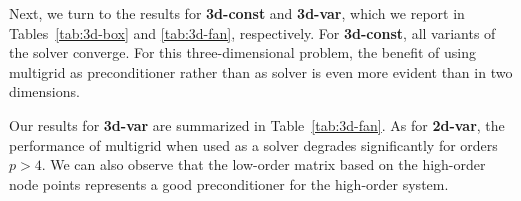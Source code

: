 \documentclass[times]{nlaauth}
\begin{document}

Next, we turn to the results for {\bf 3d-const} and {\bf 3d-var},
which we report in Tables~\ref{tab:3d-box} and \ref{tab:3d-fan},
respectively. For {\bf 3d-const}, all variants of the solver
converge. For this three-dimensional problem, the benefit of using
multigrid as preconditioner rather than as solver is even more evident
than in two dimensions.


Our results for {\bf 3d-var} are
summarized in Table~\ref{tab:3d-fan}. As for {\bf 2d-var}, the
performance of multigrid when used as a solver degrades significantly
for orders $p>4$. We can also observe that the low-order matrix based on
the high-order node points represents a good preconditioner for the
high-order system. 
\end{document}
